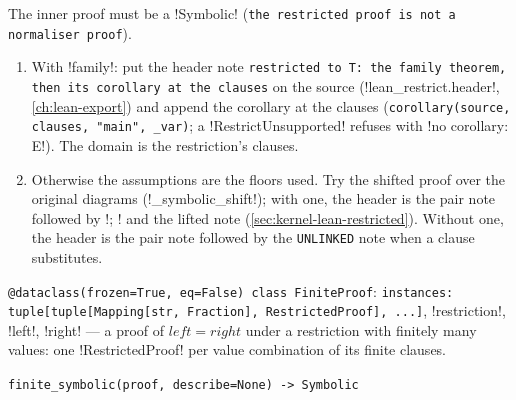 \begin{algorithm}\label{alg:kernel-restricted-symbolic}
The inner proof must be a \py!Symbolic! (\texttt{the restricted proof is not a normaliser proof}).
\begin{enumerate}
\item With \code!family!: put the header note \texttt{restricted to T: the family theorem,\allowbreak{} then its corollary at the clauses} on the source (\py!lean_restrict.header!, \cref{ch:lean-export}) and append the corollary at the clauses (\texttt{corollary(\allowbreak{}source,\allowbreak{} clauses,\allowbreak{} "main",\allowbreak{} \_\allowbreak{}var)}; a \py!RestrictUnsupported! refuses with \code!no corollary: E!). The domain is the restriction's clauses.
\item Otherwise the assumptions are the floors used. Try the shifted proof over the original diagrams (\py!_symbolic_shift!); with one, the header is the pair note followed by \code!; ! and the lifted note (\cref{sec:kernel-lean-restricted}). Without one, the header is the pair note followed by the \texttt{UNLINKED} note when a clause substitutes.
\end{enumerate}
\end{algorithm}

\begin{signature}
\texttt{@dataclass(\allowbreak{}frozen=True,\allowbreak{} eq=False) class FiniteProof}: \texttt{instances: tuple[tuple[Mapping[str,\allowbreak{} Fraction],\allowbreak{} RestrictedProof],\allowbreak{} .\allowbreak{}.\allowbreak{}.\allowbreak{}]}, \py!restriction!, \py!left!, \py!right! --- a proof of $\mathit{left}=\mathit{right}$ under a restriction with finitely many values: one \py!RestrictedProof! per value combination of its finite clauses.

\texttt{finite\_\allowbreak{}symbolic(\allowbreak{}proof,\allowbreak{} describe=None) -> Symbolic}
\end{signature}

